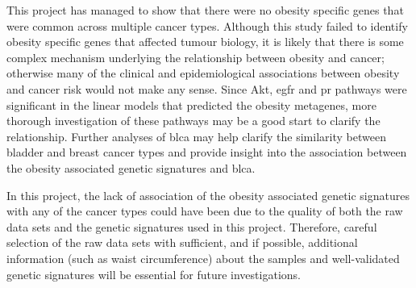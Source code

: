 This project has managed to show that there were no obesity specific genes  that were common across multiple cancer types.
Although this study failed to identify obesity specific genes that affected tumour biology, it is likely that there is some complex mechanism underlying the relationship between obesity and cancer; otherwise many of the clinical and epidemiological associations between obesity and cancer risk would not make any sense.
Since Akt, \gls{egfr} and \gls{pr} pathways were significant in the linear models that predicted the obesity metagenes, more thorough investigation of these pathways may be a good start to clarify the relationship.
Further analyses of \gls{blca} may help clarify the similarity between bladder and breast cancer types and provide insight into the association between the obesity associated genetic signatures and \gls{blca}.

In this project, the lack of association of the obesity associated genetic signatures with any of the cancer types could have been due to the quality of both the raw data sets and the genetic signatures used in this project.
Therefore, careful selection of the raw data sets with sufficient, and if possible, additional information (such as waist circumference) about the samples and well-validated genetic signatures will be essential for future investigations.

